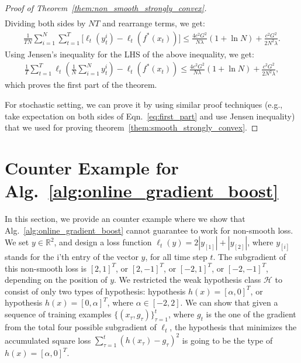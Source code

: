 \begin{proof}[Proof of Theorem~\ref{them:non_smooth_strongly_convex}]
\begin{align}
\end{align}
Dividing both sides by $NT$ and rearrange terms, we get:
\begin{align}
\frac{1}{TN}\sum_{i=1}^N\sum_{t=1}^T\big[\ell_t(y_t^i) - \ell_t(f^*(x_t))\big] \leq \frac{4c^2G^2}{N\lambda}(1+\ln N) + \frac{c^2G^2}{2N^2\lambda}.  \nonumber
\end{align} Using Jensen's inequality for the LHS of the above inequality, we get:
\begin{align}
\label{eq:first_part}
\frac{1}{T}\sum_{t=1}^T\ell_t(\frac{1}{N}\sum_{i=1}^N y_t^i) - \ell_t(f^*(x_t)) \leq \frac{4c^2G^2}{N\lambda}(1+\ln N) + \frac{c^2G^2}{2N^2\lambda},  \nonumber
\end{align} which proves the first part of the theorem. 

For stochastic setting, we can prove it by using similar proof techniques (e.g., take expectation on both sides of Eqn.~\ref{eq:first_part} and use Jensen inequality) that we used for proving  theorem~\ref{them:smooth_strongly_convex}. 
\end{proof}

\section{Counter Example for
Alg.~\ref{alg:online_gradient_boost}}
\label{sec:counter_example}
In this section, we provide an counter example where we show that Alg.~\ref{alg:online_gradient_boost} cannot guarantee to work for non-smooth loss. We set $y\in\mathbb{R}^2$, and design a loss function $\ell_t(y) = 2|y_{[1]}|+|y_{[2]}|$, where $y_{[i]}$ stands for the i'th entry of the vector $y$, for all time step $t$. The subgradient of this non-smooth loss is $[2,1]^T$, or $[2,-1]^T$, or $[-2,1]^T$, or $[-2,-1]^T$, depending on the position of $y$. We restricted the weak hypothesis class $\mathcal{H}$ to consist of only two types of hypothesis: hypothesis $h(x) = [\alpha, 0]^T$, or hypothesis $h(x) = [0,\alpha]^T$, where $\alpha \in [-2,2]$. We can show that given a sequence of training examples $\{(x_{\tau}, g_{\tau})\}_{\tau=1}^t$, where $g_t$ is the one of the gradient from the total four possible subgradient of $\ell_t$, the hypothesis that minimizes the accumulated square loss $\sum_{\tau=1}^t (h(x_{\tau}) - g_{\tau})^2$ is going to be the type of $h(x) = [\alpha, 0]^T$.

